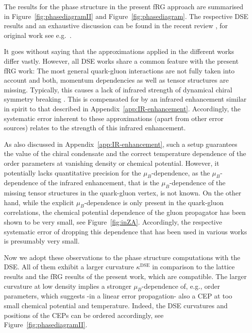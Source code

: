 \documentclass[%
reprint,
superscriptaddress,
showpacs,preprintnumbers,
 amsmath,amssymb,
 aps,
prd,
]{revtex4-1}
\def\Fig#1{Figure~\ref{#1}}
\def\fig#1{Figure~\ref{#1}}
\def\app#1{Appendix~\ref{#1}}
\begin{document}
The results for the phase structure in the present fRG approach are
summarised in \Fig{fig:phasediagramII} and \Fig{fig:phasediagram}.
The respective DSE results and an exhaustive discussion can be found
in the recent review \cite{Fischer:2018sdj}, for original work see
e.g.\ \cite{Qin:2010nq, Fischer:2011mz, Fischer:2012vc,
  Fischer:2013eca, Fischer:2014ata, Fischer:2014vxa, Mueller:2015fka,
  Eichmann:2015kfa, Gao:2015kea, Gao:2016qkh}.

It goes without saying that the approximations applied in the
different works differ vastly. However, all DSE works share a common
feature with the present fRG work: The most general quark-gluon
interactions are not fully taken into account and both, momentum
dependencies as well as tensor structures are missing. Typically, this
causes a lack of infrared strength of dynamical chiral symmetry
breaking \cite{Mitter:2014wpa, Cyrol:2017ewj}. This is compensated for
by an infrared enhancement similar in spirit to that described in
\app{app:IR-enhancement}. Accordingly, the systematic error inherent
to these approximations (apart from other error sources) relates to
the strength of this infrared enhancement.

As also discussed in \app{app:IR-enhancement}, such a setup guarantees
the value of the chiral condensate and the correct temperature
dependence of the order parameters at vanishing density or chemical
potential. However, it potentially lacks quantitative precision for
the $\mu_B$-dependence, as the $\mu_B$-dependence of the infrared
enhancement, that is the $\mu_B$-dependence of the missing tensor
structures in the quark-gluon vertex, is not known. On the other hand,
while the explicit $\mu_B$-dependence is only present in the
quark-gluon correlations, the chemical potential dependence of the
gluon propagator has been shown to be very small, see
\fig{fig:inZA}. Accordingly, the respective systematic error of
dropping this dependence that has been used in various works is
presumably very small.

Now we adopt these observations to the phase structure computations
with the DSE. All of them exhibit a larger curvature
$\kappa^\textrm{DSE}$ in comparison to the lattice results and the fRG
results of the present work, which are compatible. The larger
curvature at low density implies a stronger $\mu_B$-dependence of,
e.g., order parameters, which suggests -in a linear error propagation-
also a CEP at too small chemical potential and temperature. Indeed,
the DSE curvatures and positions of the CEPs can be ordered
accordingly, see \Fig{fig:phasediagramII}.
\end{document}
